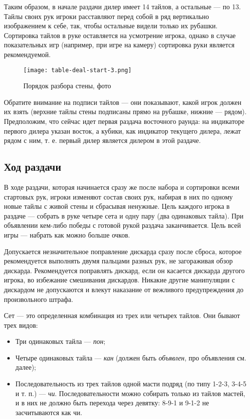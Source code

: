 Таким образом, в начале раздачи дилер имеет 14 тайлов, а остальные --- по 13. Тайлы своих рук игроки расставляют перед собой в ряд вертикально изображением к себе, так, чтобы остальные видели только их рубашки. Сортировка тайлов в руке оставляется на усмотрение игрока, однако в случае показательных игр (например, при игре на камеру) сортировка руки является рекомендуемой.

\begin{figure}[H]
	\centering
	\texttt{[image: table-deal-start-3.png]}
	\caption{Порядок разбора стены, фото}
\end{figure}

Обратите внимание на подписи тайлов --- они показывают, какой игрок должен их взять (верхние тайлы стены подписаны прямо на рубашке, нижние --- рядом). Предположим, что сейчас идет первая раздача восточного раунда: на индикаторе первого дилера указан восток, а кубики, как индикатор текущего дилера, лежат рядом с ним, т. е. первый дилер является дилером в этой раздаче.

\subsection{Ход раздачи}

В ходе раздачи, которая начинается сразу же после набора и сортировки всеми стартовых рук, игроки изменяют состав своих рук, набирая в них по одному новые тайлы с живой стены и сбрасывая ненужные. Цель каждого игрока в раздаче --- собрать в руке четыре сета и одну пару (два одинаковых тайла). При объявлении кем-либо победы с готовой рукой раздача заканчивается. Цель всей игры --- набрать как можно больше очков.

Допускается незначительное поправление дискарда сразу после сброса, которое рекомендуется выполнять двумя пальцами разных рук, не загораживая обзор дискарда. Рекомендуется поправлять дискард, если он касается дискарда другого игрока, во избежание смешивания дискардов. Никакие другие манипуляции с дискардом не допускаются и влекут наказание от вежливого предупреждения до произвольного штрафа.

Сет --- это определенная комбинация из трех или четырех тайлов. Они бывают трех видов:
\begin{itemize}
	\item Три одинаковых тайла --- \textit{пон};
	\item Четыре одинаковых тайла --- \textit{кан} (должен быть \textit{объявлен}, про объявления см. далее);
	\item Последовательность из трех тайлов одной масти подряд (по типу 1-2-3, 3-4-5 и т. п.) --- \textit{чи}. Последовательности можно собирать только из тайлов мастей, и в них не должно быть перехода через девятку: 8-9-1 и 9-1-2 не засчитываются как чи.
\end{itemize}

